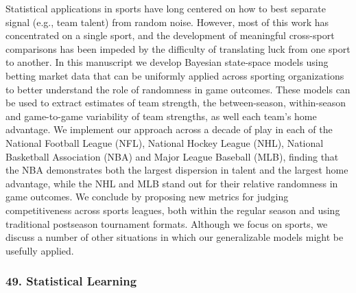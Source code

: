 \begin{itemize}
Statistical applications in sports have long centered on how to best separate signal (e.g., team talent) from random noise. However, most of this work has concentrated on a single sport, and the development of meaningful cross-sport comparisons has been impeded by the difficulty of translating luck from one sport to another. In this manuscript we develop Bayesian state-space models using betting market data that can be uniformly applied across sporting organizations to better understand the role of randomness in game outcomes. These models can be used to extract estimates of team strength, the between-season, within-season and game-to-game variability of team strengths, as well each team’s home advantage. We implement our approach across a decade of play in each of the National Football League (NFL), National Hockey League (NHL), National Basketball Association (NBA) and Major League Baseball (MLB), finding that the NBA demonstrates both the largest dispersion in talent and the largest home advantage, while the NHL and MLB stand out for their relative randomness in game outcomes. We conclude by proposing new metrics for judging competitiveness across sports leagues, both within the regular season and using traditional postseason tournament formats. Although we focus on sports, we discuss a number of other situations in which our generalizable models might be usefully applied.

\end{itemize}

\subsubsection*{49. Statistical Learning}

